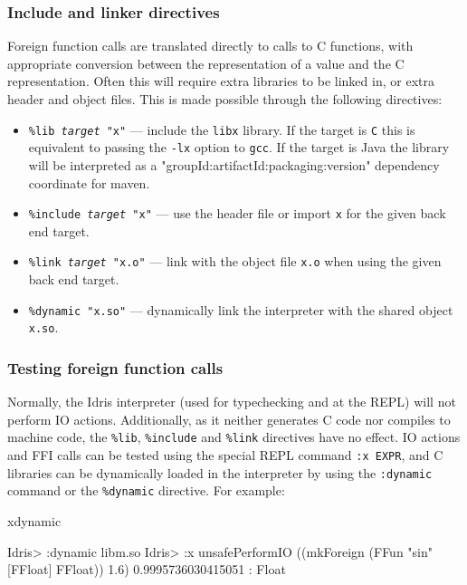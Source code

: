\subsubsection*{Include and linker directives}

Foreign function calls are translated directly to calls to C functions, with appropriate
conversion between the \Idris{} representation of a value and the C representation.
Often this will require extra libraries to be linked in, or extra header and object files.
This is made possible through the following directives:

\begin{itemize}
\item \texttt{\%lib \emph{target} "x"} --- include the \texttt{libx} library. If the target is \texttt{C} this is equivalent to passing the
\texttt{-lx} option to \texttt{gcc}. If the target is Java the library will be interpreted as a 
"groupId:artifactId:packaging:version" dependency coordinate for maven.
\item \texttt{\%include \emph{target} "x"} --- use the header file or import \texttt{x} for the given back end target.
\item \texttt{\%link \emph{target} "x.o"} --- link with the object file \texttt{x.o} when using the given back end target.
\item \texttt{\%dynamic "x.so"} --- dynamically link the interpreter with the shared object \texttt{x.so}.
\end{itemize}

\subsubsection*{Testing foreign function calls}
Normally, the Idris interpreter (used for typechecking and at the REPL) will
not perform IO actions.  Additionally, as it neither generates C code nor
compiles to machine code, the \texttt{\%lib}, \texttt{\%include} and
\texttt{\%link} directives have no effect. IO actions and FFI calls can be
tested using the special REPL command \texttt{:x EXPR}, and C libraries can be
dynamically loaded in the interpreter by using the \texttt{:dynamic} command
or the \texttt{\%dynamic} directive. For example:

\begin{SaveVerbatim}{xdynamic}

Idris> :dynamic libm.so
Idris> :x unsafePerformIO ((mkForeign (FFun "sin" [FFloat] FFloat)) 1.6)
0.9995736030415051 : Float

\end{SaveVerbatim}

